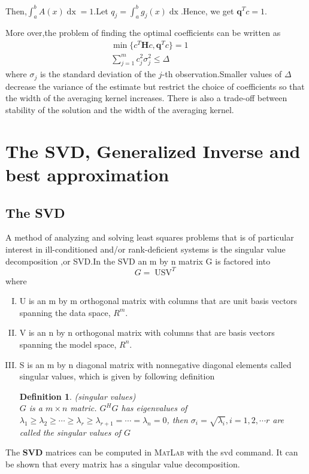\documentclass[a4paper]{article}
\newtheorem{definition}[theorem]{Definition}
\newcommand{\tmmathbf}[1]{\ensuremath{\boldsymbol{#1}}}
\newcommand{\tmop}[1]{\ensuremath{\operatorname{#1}}}
\newcommand{\tmstrong}[1]{\textbf{#1}}
\newenvironment{enumerateromancap}{\begin{enumerate}[I.] }{\end{enumerate}}
\begin{document}
Then,$\int_a^b A (x) \tmop{dx} = 1$.Let $q_j = \int_a^b g_j (x)
\tmop{dx}$.Hence, we get $\tmmathbf{q}^T c = 1$.

More over,the problem of finding the optimal coefficients can be written as
\begin{eqnarray}
  \min \{c^T \tmmathbf{H}c, \tmmathbf{q}^T c\}= 1 &  & \\
  \sum^m_{j = 1} c_{j^{}}^2 \sigma^2_j \leq \Delta &  &
\end{eqnarray}
where $\sigma_j$ is the standard deviation of the $j$-th observation.Smaller
values of $\Delta$ decrease the variance of the estimate but restrict the
choice of coefficients so that the width of the averaging kernel increases.
There is also a trade-off between stability of the solution and the width of
the averaging kernel.


\section{The SVD, Generalized Inverse and best approximation}

\subsection{The SVD}

A method of analyzing and solving least squares problems that is of particular
interest in ill-conditioned and/or rank-deficient systems is the singular
value decomposition ,or SVD.In the SVD{\cite{4}} an m by n matrix G is
factored into
\[ G = \tmop{USV}^T \]
where
\begin{enumerateromancap}
  \item U is an m by m orthogonal matrix with columns that are unit basis
  vectors spanning the data space, $R^m$.

  \item V is an n by n orthogonal matrix with columns that are basis vectors
  spanning the model space, $R^n$.

  \item S is an m by n diagonal matrix with nonnegative diagonal elements
  called singular values,
  which is given by following definition
  \begin{definition}(singular values)\\
  $G$ is a $m\times n$ matric. ${{G}^{H}}G$ has eigenvalues of ${{\lambda }_{1}}\ge {{\lambda }_{2}}\ge \cdots \ge {{\lambda }_{r}}\ge {{\lambda }_{r+1}}=\cdots ={{\lambda }_{n}}=0$, then ${{\sigma }_{i}}=\sqrt{{{\lambda }_{i}}},i=1,2,\cdots r$ are called the singular values of $G$
  \end{definition}


\end{enumerateromancap}
The {\tmstrong{SVD}} matrices can be computed in \textsc{MatLab} with the svd command.
It can be shown that every matrix has a singular value
decomposition{\cite{5}}.\\
\end{document}
